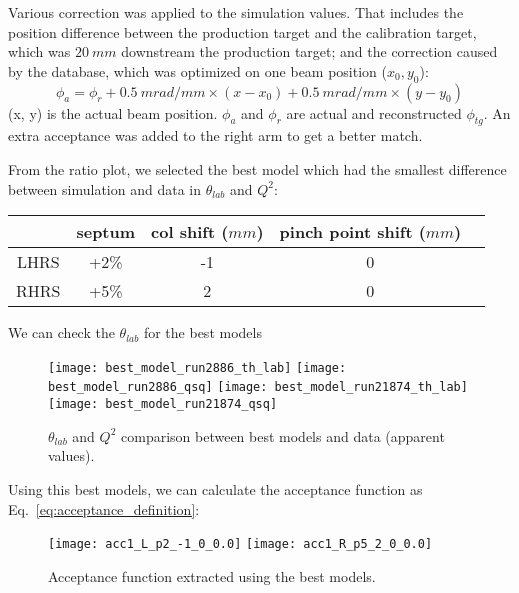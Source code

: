 Various correction was applied to the simulation values. That includes the position
difference between the production target and the calibration target, which was
$20\ mm$ downstream the production \Ca target; and the correction caused by
the database, which was optimized on one beam position ($x_0, y_0$):
\begin{equation}
    \phi_a = \phi_r + 0.5\ mrad/mm \times (x - x_0) + 0.5\ mrad/mm \times (y - y_0)
\end{equation}
(x, y) is the actual beam position. $\phi_a$ and $\phi_r$ are actual and reconstructed
$\phi_{tg}$. An extra acceptance was added to the right arm to get a better 
match.

From the ratio plot, we selected the best model which had the smallest difference
between simulation and data in $\theta_{lab}$ and $Q^2$:
\begin{table}[h!]
    \centering
    \begin{tabular}{c | c c c c}
	\hline
	    & septum & col shift ($mm$)	& pinch point shift ($mm$)	\\
	\hline
	LHRS	& +2\%	& -1	& 0 \\
	RHRS	& +5\%	& 2	& 0 \\
	\hline
    \end{tabular}
\end{table}

We can check the $\theta_{lab}$ for the best models
\begin{figure}[H]
    \centering
    \texttt{[image: best\_model\_run2886\_th\_lab]}
    \texttt{[image: best\_model\_run2886\_qsq]}
    \texttt{[image: best\_model\_run21874\_th\_lab]}
    \texttt{[image: best\_model\_run21874\_qsq]}
    \caption{$\theta_{lab}$ and $Q^2$ comparison between best models and data (apparent values).}
\end{figure}

Using this best models, we can calculate the acceptance function as Eq.~\ref{eq:acceptance_definition}:
\begin{figure}[H]
    \centering
    \texttt{[image: acc1\_L\_p2\_-1\_0\_0.0]}
    \texttt{[image: acc1\_R\_p5\_2\_0\_0.0]}
    \caption{Acceptance function extracted using the best models.}
\end{figure}

